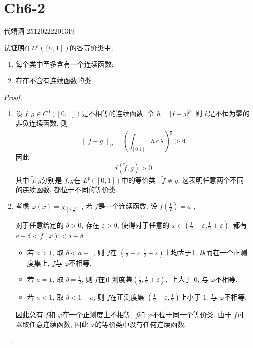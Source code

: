 \documentclass[../main.tex]{subfiles}
\begin{document}
\ifSubfilesClassLoaded{

    
    \setcounter{chapter}{5}
}{}

\chapter{ Ch6-2 }
 代靖涵 25120222201319
\begin{exercise}{}{}
试证明在$L^{p}([0,1])$的各等价类中,
\begin{enumerate}
  \item 每个类中至多含有一个连续函数;
  \item 存在不含有连续函数的类.
\end{enumerate}
\end{exercise}

\begin{proof}
  \begin{enumerate}
    \item 设 \(  f,g \in C^0\left( \left[ 0,1 \right]  \right)  \)是不相等的连续函数, 令 \(  h= \left| f-g \right|^{p}   \), 则 \(  h  \)是不恒为零的非负连续函数,   则 \[
    \left\| f-g \right\|_{p}= \left( \int_{[0,1]}h\,\mathrm{d}  \lambda  \right)^{\frac{1}{p}}> 0 
    \] 因此 \[
    d\left( \tilde{f},\tilde{g} \right)> 0 
    \]其中 \(  \tilde{f},\tilde{g}  \)分别是 \(  f,g  \)在 \(  L^{p}\left( \left[ 0,1 \right]  \right)   \)中的等价类   . \(  \tilde{f}\neq \tilde{g}  \). 这表明任意两个不同的连续函数, 都位于不同的等价类.
    \item 考虑 \(   \varphi \left( x \right)= \chi _{\left[ 0,\frac{1}{2} \right] }   \) , 若 \(  f  \)是一个连续函数.  
    设 \(  f\left( \frac{1}{2} \right)= a   \)  ,
    
    对于任意给定的 \(   \delta > 0  \),   存在 \(   \varepsilon > 0  \), 使得对于任意的 \(  x\in \left( \frac{1}{2}- \varepsilon ,\frac{1}{2}+  \varepsilon  \right)   \), 都有   \(  a- \delta < f\left( x \right)< a+ \delta   \) 

    \begin{itemize}
      \item 若 \(  a> 1  \), 取 \(   \delta < a-1  \), 则 \(  f  \)在 \(  \left( \frac{1}{2}- \varepsilon , \frac{1}{2}+  \varepsilon  \right)   \)上均大于1, 从而在一个正测度集上,  \(  f  \)与 \(   \varphi   \)不相等.
      \item 若  \(  a= 1  \), 取 \(   \delta = \frac{1}{2}  \), 则 \(  f  \)在正测度集\(  (\frac{1}{2},\frac{1}{2}+  \varepsilon ),  \)    上大于 \(  0  \), 与 \(   \varphi   \)不相等. 
      \item 若 \(  a< 1  \), 取 \(   \delta < 1-a  \), 则 \(  f  \)在正测度集 \(  \left( \frac{1}{2}- \varepsilon , \frac{1}{2} \right)   \)上小于 \(  1  \), 与 \(   \varphi   \)不相等.      
    \end{itemize}
    因此总有 \(  f  \)和 \(   \varphi   \)在一个正测度上不相等, \(  f  \)和 \(   \varphi   \)不位于同一个等价类. 由于 \(  f  \)可以取任意连续函数, 因此 \(   \varphi   \)的等价类中没有任何连续函数.      
    \end{enumerate}
  
\end{proof}
\end{document}

